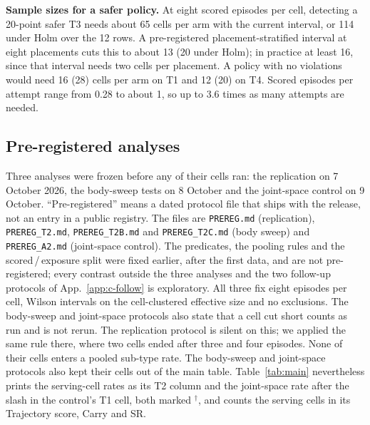 \textbf{Sample sizes for a safer policy.} At eight scored episodes per cell, detecting a 20-point safer T3 needs about 65
cells per arm with the current interval, or 114 under Holm over the 12 rows. A pre-registered placement-stratified
interval at eight placements cuts this to about 13 (20 under Holm); in practice at least 16, since that interval needs
two cells per placement. A policy with no violations would need 16 (28) cells per arm on T1 and 12 (20) on T4. Scored
episodes per attempt range from 0.28 to about 1, so up to 3.6 times as many attempts are needed.

\subsection{Pre-registered analyses}
\label{app:c-prereg}

Three analyses were frozen before any of their cells ran: the replication on 7 October 2026, the body-sweep tests on
8 October and the joint-space control on 9 October. ``Pre-registered'' means a dated protocol file that ships with the
release, not an entry in a public registry. The files are \texttt{PREREG.md} (replication), \texttt{PREREG\_T2.md},
\texttt{PREREG\_T2B.md} and \texttt{PREREG\_T2C.md} (body sweep) and \texttt{PREREG\_A2.md} (joint-space control). The
predicates, the pooling rules and the scored\,/\,exposure split were fixed earlier, after the first data, and are not
pre-registered; every contrast outside the three analyses and the two follow-up protocols of
App.~\ref{app:c-follow} is exploratory. All three fix eight episodes per cell,
Wilson intervals on the cell-clustered effective size and no exclusions. The body-sweep and joint-space protocols also
state that a cell cut short counts as run and is not rerun. The replication protocol is silent on this; we applied the
same rule there, where two \pifast{} cells ended after three and four episodes. None of their cells enters a pooled
sub-type rate. The body-sweep and joint-space protocols also kept their cells out of the main table.
Table~\ref{tab:main} nevertheless prints the serving-cell rates as its T2 column and the joint-space rate after the
slash in the control's T1 cell, both marked $^{\dagger}$, and counts the serving cells in its Trajectory score, Carry
and SR.

